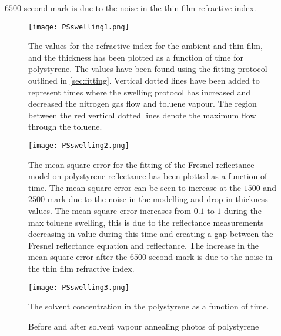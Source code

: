 \documentclass[MasterThesisMain.tex]{subfiles}
\begin{document}
$6500$ second mark is due to the noise in the thin film refractive index.       

\begin{figure}
\centering
\texttt{[image: PSswelling1.png]}
\caption{The values for the refractive index for the ambient and thin film, and the thickness has been plotted as a function of time for polystyrene. The values have been found using the fitting protocol outlined in \ref{sec:fitting}. Vertical dotted lines have been added to represent times where the swelling protocol has increased and decreased the nitrogen gas flow and toluene vapour. The region between the red vertical dotted lines denote the maximum flow through the toluene.}
\label{fig:PSswelling1}
\end{figure}


\begin{figure}
\centering
\texttt{[image: PSswelling2.png]}
\caption{The mean square error for the fitting of the Fresnel reflectance model on polystyrene reflectance has been plotted as a function of time. The mean square error can be seen to increase at the $1500$ and $2500$ mark due to the noise in the modelling and drop in thickness values. The mean square error increases from $0.1$ to $1$ during the max toluene swelling, this is due to the reflectance measurements decreasing in value during this time and creating a gap between the Fresnel reflectance equation and reflectance. The increase in the mean square error after the $6500$ second mark is due to the noise in the thin film refractive index.}
\label{fig:PSswelling2}
\end{figure}

\begin{figure}
\centering
\texttt{[image: PSswelling3.png]}
\caption{The solvent concentration in the polystyrene as a function of time.}
\label{fig:PSswelling3}
\end{figure}

\begin{figure}
\centering     
{}
\caption{Before and after solvent vapour annealing photos of polystyrene}
\end{figure}
	
\end{document}
